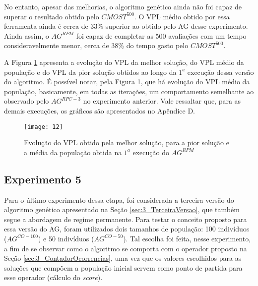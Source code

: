 No entanto, apesar das melhorias, o algoritmo genético ainda não foi capaz de superar o resultado obtido pelo $CMOST^{500}$. O VPL médio obtido por essa ferramenta ainda é cerca de 33\% superior ao obtido pelo AG desse experimento. Ainda assim, o $AG^{RPM}$ foi capaz de completar as 500 avaliações com um tempo consideravelmente menor, cerca de 38\% do tempo gasto pelo $CMOST^{500}$.

A Figura \ref{fig:graph4_1} apresenta a evolução do VPL da melhor solução, do VPL médio da população e do VPL da pior solução obtidos ao longo da $1^a$ execução dessa versão do algoritmo. É possível notar, pela Figura \ref{fig:graph4_1}, que há evolução do VPL médio da população, basicamente, em todas as iterações, um comportamento semelhante ao observado pelo $AG^{RPC-3}$ no experimento anterior. Vale ressaltar que, para as demais execuções, os gráficos são apresentados no Apêndice D.

\begin{figure}[H]
\centering

\texttt{[image: 12]}

\caption{Evolução do VPL obtido pela melhor solução, para a pior solução e a média da população obtida na $1^a$ execução do $AG^{RPM}$}
\label{fig:graph4_1}
\end{figure}

\subsection{Experimento 5}
\label{ch:5_Experimento5}
Para o último experimento dessa etapa, foi considerada a terceira versão do algoritmo genético apresentado na Seção \ref{sec:3_TerceiraVersao}, que também segue a abordagem de regime permanente. Para testar o conceito proposto para essa versão do AG, foram utilizados dois tamanhos de população: 100 indivíduos ($AG^{CO-{100}}$) e 50 indivíduos ($AG^{CO-{50}}$). Tal escolha foi feita, nesse experimento, a fim de se observar como o algoritmo se comporta com o operador proposto na Seção \ref{sec:3_ContadorOcorrencias}, uma vez que os valores escolhidos para as soluções que compõem a população inicial servem como ponto de partida para esse operador (cálculo do \textit{score}).

